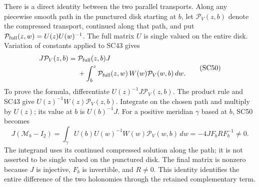 There is a direct identity between the two parallel transports.
Along any piecewise smooth path in the punctured disk starting
at \(b\), let \(\mathcal P_V(z,b)\) denote the compressed
transport, continued along that path, and put
\(\mathcal P_{\rm full}(z,w)=U(z)U(w)^{-1}\).
The full matrix \(U\) is single valued on the entire disk.
Variation of constants applied to SC43 gives
\[
 \begin{split}
 J\mathcal P_V(z,b)
   ={}&\mathcal P_{\rm full}(z,b)J\\
    &+\int_b^z
      \mathcal P_{\rm full}(z,w)\,
      W(w)\mathcal P_V(w,b)\,dw .
 \end{split}\tag{SC50}
\]
To prove the formula, differentiate
\(U(z)^{-1}J\mathcal P_V(z,b)\). The product rule and SC43
give \(U(z)^{-1}W(z)\mathcal P_V(z,b)\). Integrate on the
chosen path and multiply by \(U(z)\); its value at \(b\)
is \(U(b)^{-1}J\). For a positive meridian \(\gamma\) based
at \(b\), SC50 becomes
\[
 J(\mathcal M_b-I_2)
   =\int_\gamma U(b)U(w)^{-1}W(w)
          \mathcal P_V(w,b)\,dw
   =-4JF_bRF_b^{-1}\ne0 .
 \tag{SC51}
\]
The integrand uses its continued compressed solution along
the path; it is not asserted to be single valued on the
punctured disk. The final matrix is nonzero because \(J\)
is injective, \(F_b\) is invertible, and \(R\ne0\).
This identity identifies the entire difference of the two
holonomies through the retained complementary term.


